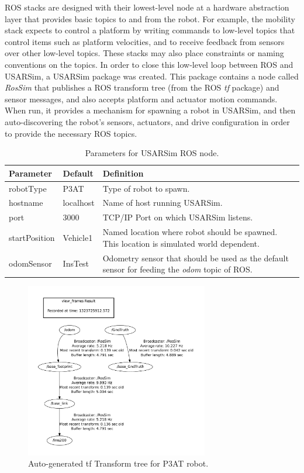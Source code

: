 ROS stacks are designed with their lowest-level node at a hardware abstraction layer that provides basic topics to and from the robot. For example, the mobility stack expects to control a platform by writing commands to low-level topics that control items such as platform velocities, and to receive feedback from sensors over other low-level topics. These stacks may also place constraints or naming conventions on the topics.  In order to close this low-level loop between ROS and USARSim, a USARSim package was created. This package contains a node called {\it RosSim} that publishes a ROS transform tree (from the ROS {\it tf} package) and sensor messages, and also accepts platform and actuator motion commands. When run, it provides a mechanism for spawning a robot in USARSim, and then auto-discovering the robot's sensors, actuators, and drive configuration in order to provide the necessary ROS topics. 
 \begin{table}[t!]
    \begin{center}
    \small{
    \begin{tabular}{ | l | l | p{4cm} |}
    \hline
    Parameter & Default & Definition \\ \hline
   robotType & P3AT & Type of robot to spawn. \\ \hline
   hostname & localhost & Name of host running USARSim. \\ \hline
   port & 3000 & TCP/IP Port on which USARSim listens. \\ \hline
   startPosition & Vehicle1 & Named location where robot should be spawned. This location is simulated world dependent. \\ \hline
   odomSensor & InsTest & Odometry sensor that should be used as the default sensor for feeding the {\it odom} topic of ROS.\\ \hline
    \end{tabular}
   }
    \caption{Parameters for USARSim ROS node.}
    \label{Table:USARSimNode}
    \end{center}
\end{table}
\begin{figure}[t!]
\centering
\includegraphics[width=8cm]{Figures/ROS/P3ATFrames.pdf}
\caption{Auto-generated tf Transform tree for P3AT robot.}
\label{Fig:P3ATTransformTree}
\end{figure}

